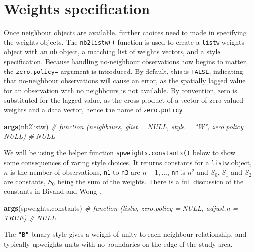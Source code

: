 \documentclass[]{book}
\newenvironment{Shaded}{\begin{snugshade}}{\end{snugshade}}
\newcommand{\CommentTok}[1]{\textcolor[rgb]{0.56,0.35,0.01}{\textit{#1}}}
\newcommand{\KeywordTok}[1]{\textcolor[rgb]{0.13,0.29,0.53}{\textbf{#1}}}
\newcommand{\NormalTok}[1]{#1}
\begin{document}
\hypertarget{weights-specification}{%
\section{Weights specification}\label{weights-specification}}

Once neighbour objects are available, further choices need to made in specifying the weights objects. The \texttt{nb2listw()} function is used to create a \texttt{listw} weights object with an \texttt{nb} object, a matching list of weights vectors, and a style specification. Because handling no-neighbour observations now begins to matter, the \texttt{zero.policy=} argument is introduced. By default, this is \texttt{FALSE}, indicating that no-neighbour observations will cause an error, as the spatially lagged value for an observation with no neighbours is not available. By convention, zero is substituted for the lagged value, as the cross product of a vector of zero-valued weights and a data vector, hence the name of \texttt{zero.policy}.

\begin{Shaded}
\begin{Highlighting}[]
\KeywordTok{args}\NormalTok{(nb2listw)}
\CommentTok{# function (neighbours, glist = NULL, style = "W", zero.policy = NULL) }
\CommentTok{# NULL}
\end{Highlighting}
\end{Shaded}

We will be using the helper function \texttt{spweights.constants()} below to show some consequences of varing style choices. It returns constants for a \texttt{listw} object, \(n\) is the number of observations, \texttt{n1} to \texttt{n3} are \(n-1, \ldots\), \texttt{nn} is \(n^2\) and \(S_0\), \(S_1\) and \(S_2\) are constants, \(S_0\) being the sum of the weights. There is a full discussion of the constants in Bivand and Wong \citeyearpar{Bivand2018}.

\begin{Shaded}
\begin{Highlighting}[]
\KeywordTok{args}\NormalTok{(spweights.constants)}
\CommentTok{# function (listw, zero.policy = NULL, adjust.n = TRUE) }
\CommentTok{# NULL}
\end{Highlighting}
\end{Shaded}

The \texttt{"B"} binary style gives a weight of unity to each neighbour relationship, and typically upweights units with no boundaries on the edge of the study area.
\end{document}
